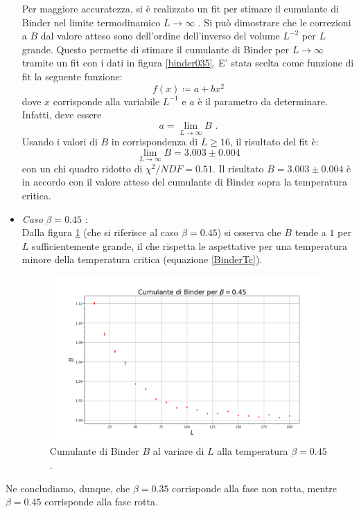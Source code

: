 \documentclass[10pt,a4paper]{article}
\begin{document}
\begin{itemize}
	Per maggiore accuratezza, si è realizzato un fit per stimare il cumulante di Binder nel limite termodinamico $L \rightarrow \infty$ . Si può dimostrare che le correzioni a $B$ dal valore atteso sono dell'ordine dell'inverso del volume $L^{-2}$ per $L$ grande. Questo permette di stimare il cumulante di Binder per $L\rightarrow\infty$ tramite un fit con i dati in figura \ref{binder035}. E' stata scelta come funzione di fit la seguente funzione: $$f(x)\coloneqq a+bx^2$$ dove $x$ corrisponde alla variabile $L^{-1}$ e $a$ è il parametro da determinare. Infatti, deve essere $$a=\lim_{L \to \infty}B\text{ .}$$
	 Usando i valori di $B$ in corrispondenza di $L\ge16$, il risultato del fit è: $$\lim_{L \to \infty}B=3.003 \pm 0.004 $$ con un chi quadro ridotto di $\chi^2/NDF=0.51$. Il risultato $B=3.003 \pm 0.004 $ è in accordo con il valore atteso del cumulante di Binder sopra la temperatura critica.
	\item \emph{Caso} $\beta=0.45$ :\\
	Dalla figura \ref{binder045} (che si riferisce al caso $\beta=0.45$) si osserva che $B$ tende a $1$ per $L$ sufficientemente grande, il che rispetta le aspettative per una temperatura minore della temperatura critica (equazione \ref{BinderTc}).
	\begin{figure}[h!]%
		\centering
		\includegraphics[width=1\linewidth]{binder045}
		\caption{Cumulante di Binder $B$ al variare di $L$ alla temperatura $\beta=0.45$.}
		\label{binder045}
	\end{figure}
\end{itemize}

	Ne concludiamo, dunque, che $\beta=0.35$ corrisponde alla fase non rotta, mentre $\beta=0.45$ corrisponde alla fase rotta.
\end{document}
